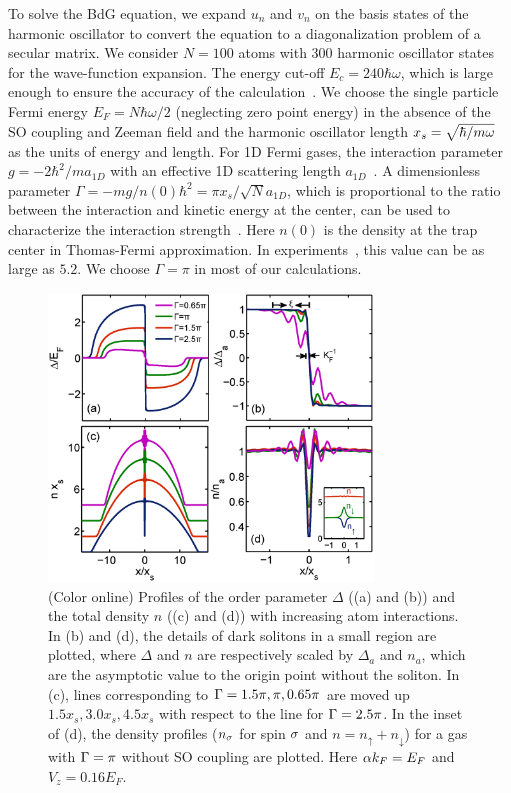 \documentclass[prl,aps,twocolumn,showpacs, floatfix]{revtex4}
\begin{document}
To solve the BdG equation, we expand $u_{n}$ and $v_{n}$ on the basis states
of the harmonic oscillator to convert the equation to a diagonalization
problem of a secular matrix. We consider $N=100$ atoms with 300 harmonic
oscillator states for the wave-function expansion. The energy cut-off $%
E_{c}=240\hbar \omega $, which is large enough to ensure the accuracy of the
calculation~\cite{HuHui2007PRA}. We choose the single particle Fermi energy $%
E_{F}=N\hbar \omega /2$ (neglecting zero point energy) in the absence of the
SO coupling and Zeeman field and the harmonic oscillator length $x_{s}=\sqrt{%
\hbar /m\omega }$ as the units of energy and length. For 1D Fermi gases, the
interaction parameter $g=-2\hbar ^{2}/ma_{1D}$ with an effective 1D
scattering length $a_{1D}$~\cite{Hulet2010Nature}. A dimensionless parameter
$\Gamma =-mg/n(0)\hbar ^{2}=\pi x_{s}/\sqrt{N}a_{1D}$, which is proportional
to the ratio between the interaction and kinetic energy at the center, can
be used to characterize the interaction strength~\cite{HuHui2007PRA}. Here $%
n(0)$ is the density at the trap center in Thomas-Fermi approximation. In
experiments~\cite{Hulet2010Nature}, this value can be as large as $5.2$. We
choose $\Gamma =\pi $ in most of our calculations.

\begin{figure}[t]
\includegraphics[width=3.4in]{Delta_g_2.eps}
\caption{(Color online) Profiles of the order parameter $\Delta $ ((a) and
(b)) and the total density $n$ ((c) and (d)) with increasing atom
interactions. In (b) and (d), the details of dark solitons in a small region
are plotted, where $\Delta $ and $n$ are respectively scaled by $\Delta _{a}$
and $n_{a}$, which are the asymptotic value to the origin point without the
soliton. In (c), lines corresponding to $\Gamma =1.5\protect\pi ,\protect\pi %
,0.65\protect\pi $ are moved up $1.5x_{s}, 3.0x_s, 4.5x_s$ with respect to
the line for $\Gamma=2.5\protect\pi$. In the inset of (d), the density
profiles ($n_\protect\sigma$ for spin $\protect\sigma$ and $%
n=n_{\uparrow}+n_{\downarrow}$) for a gas with $\Gamma=\protect\pi$ without
SO coupling are plotted. Here $\protect\alpha k_{F}=E_{F}$ and $%
V_{z}=0.16E_{F}$. }
\label{Delta_V8}
\end{figure}
\end{document}
